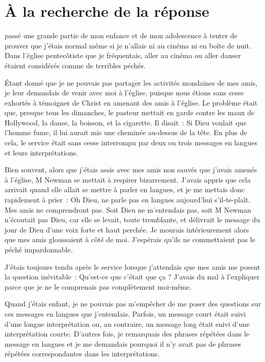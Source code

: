 \chapter{À la recherche de la réponse}

 passé une grande partie de mon enfance et de mon
 adolescence à tenter de prouver que j'étais normal même si je n'allais ni au
 cinéma ni en boîte de nuit. Dans l'église pentecôtiste que je fréquentais,
 aller au cinéma ou aller danser étaient considérés comme de terribles péchés.

Étant donné que je ne pouvais pas partager les activités mondaines de mes amis,
 je leur demandais de venir avec moi à l'église, puisque nous étions sans cesse
 exhortés à témoigner de Christ en amenant des amis à l'église. Le problème
 était que, presque tous les dimanches, le pasteur mettait en garde contre les
 maux de Hollywood, la danse, la boisson, et la cigarette.
 Il disait~: \og Si Dieu voulait que l'homme fume, il lui aurait mis une
 cheminée au-dessus de la tête.\fg{}
 En plus de cela, le service était sans cesse interrompu par deux ou trois
 \og messages en langues \fg{} et leurs interprétations.

Bien souvent, alors que j'étais assis avec mes amis non sauvés que j'avais
 amenés à l'église, M Newman se mettait à respirer bizarrement.
 J'avais appris que cela arrivait quand elle allait se mettre à parler en
 langues, et je me mettais donc rapidement à prier~:
 \og Oh Dieu, ne parle pas en langues aujourd'hui s'il-te-plaît.
 Mes amis ne comprendront pas. \fg{}
 Soit Dieu ne m'entendais pas, soit M Newman n'écoutait pas Dieu,
 car elle se levait, toute tremblante, et délivrait le message du jour de Dieu
 d'une voix forte et haut perchée. Je mourais intérieurement alors que mes amis
 gloussaient à côté de moi. J'espérais qu'ils ne commettaient pas le péché
 impardonnable.

J'étais toujours tendu après le service lorsque j'attendais que mes amis me
 posent la question inévitable~:
 \og Qu'est-ce que c'était que ça ? \fg{}
 J'avais du mal à l'expliquer parce que je ne le comprenais pas complètement
 moi-même.

Quand j'étais enfant, je ne pouvais pas m'empêcher de me poser des questions sur
 ces \og messages en langues \fg{} que j'entendais. Parfois, un message court
 était suivi d'une longue interprétation ou, au contraire, un message long était
 suivi d'une interprétation courte. D'autres fois, je remarquais des phrases
 répétées dans le message en langues et je me demandais pourquoi il n'y avait
 pas de phrases répétées correspondantes dans les interprétations.

